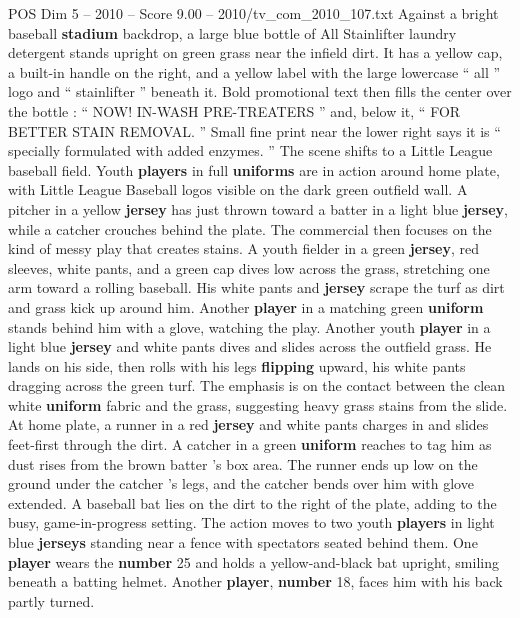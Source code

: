 \begin{textsample}{POS Dim 5 – 2010 – Score 9.00 – 2010/tv\_com\_2010\_107.txt}  \label{ex:f5_pos_047}
Against a bright baseball \textbf{stadium} backdrop, a large blue bottle of All Stainlifter laundry detergent stands upright on green grass near the infield dirt.
It has a yellow cap, a built-in handle on the right, and a yellow label with the large lowercase “ all ” logo and “ stainlifter ” beneath it.
Bold promotional text then fills the center over the bottle : “ NOW!
IN-WASH PRE-TREATERS ” and, below it, “ FOR BETTER STAIN REMOVAL. ” Small fine print near the lower right says it is “ specially formulated with added enzymes. ” The scene shifts to a Little League baseball field.
Youth \textbf{players} in full \textbf{uniforms} are in action around home plate, with Little League Baseball logos visible on the dark green outfield wall.
A pitcher in a yellow \textbf{jersey} has just thrown toward a batter in a light blue \textbf{jersey}, while a catcher crouches behind the plate.
The commercial then focuses on the kind of messy play that creates stains.
A youth fielder in a green \textbf{jersey}, red sleeves, white pants, and a green cap dives low across the grass, stretching one arm toward a rolling baseball.
His white pants and \textbf{jersey} scrape the turf as dirt and grass kick up around him.
Another \textbf{player} in a matching green \textbf{uniform} stands behind him with a glove, watching the play.
Another youth \textbf{player} in a light blue \textbf{jersey} and white pants dives and slides across the outfield grass.
He lands on his side, then rolls with his legs \textbf{flipping} upward, his white pants dragging across the green turf.
The emphasis is on the contact between the clean white \textbf{uniform} fabric and the grass, suggesting heavy grass stains from the slide.
At home plate, a runner in a red \textbf{jersey} and white pants charges in and slides feet-first through the dirt.
A catcher in a green \textbf{uniform} reaches to tag him as dust rises from the brown batter ’s box area.
The runner ends up low on the ground under the catcher ’s legs, and the catcher bends over him with glove extended.
A baseball bat lies on the dirt to the right of the plate, adding to the busy, game-in-progress setting.
The action moves to two youth \textbf{players} in light blue \textbf{jerseys} standing near a fence with spectators seated behind them.
One \textbf{player} wears the \textbf{number} 25 and holds a yellow-and-black bat upright, smiling beneath a batting helmet.
Another \textbf{player}, \textbf{number} 18, faces him with his back partly turned.

\end{textsample}

